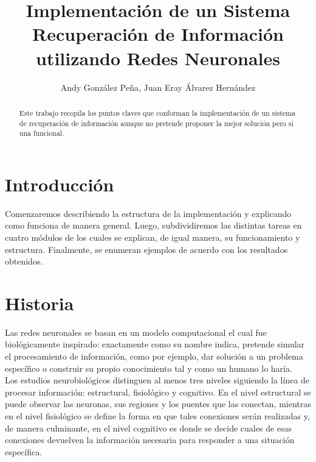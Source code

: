 \documentclass{llncs}
\begin{document}
\title{Implementaci\'on de un Sistema Recuperaci\'on de Informaci\'on utilizando Redes Neuronales}

\author{Andy Gonz\'alez Pe\~na, Juan Eray \'Alvarez Hern\'andez}

\maketitle

\begin{multicols}{2}[]

\begin{abstract}

Este trabajo recopila los puntos claves que conforman la implementaci\'on de un sistema de recuperaci\'on
de informaci\'on aunque no pretende proponer la mejor soluci\'on pero si una funcional.

\end{abstract}

\section{Introducci\'on}\label{sec:Introduction}

Comenzaremos describiendo la estructura de la implementaci\'on y explicando como funciona de manera general.
Luego, subdividiremos las distintas tareas en cuatro m\'odulos de los cuales se explican, de igual manera, su funcionamiento
y estructura. Finalmente, se enumeran ejemplos de acuerdo con los resultados obtenidos.\\

\section{Historia}\label{sec:History}

Las redes neuronales se basan en un modelo computacional el cual fue biol\'ogicamente inspirado: exactamente como
su nombre indica, pretende simular el procesamiento de informaci\'on, como por ejemplo, dar soluci\'on a un problema
espec\'ifico o construir su propio conocimiento tal y como un humano lo har\'ia. \\

Los estudios neurobiol\'ogicos distinguen al menos tres niveles siguiendo la l\'inea de procesar informaci\'on: estructural,
fisiol\'ogico y cognitivo. En el nivel estructural se puede observar las neuronas, sus regiones y los puentes que las conectan,
mientras en el nivel fisiol\'ogico se define la forma en que tales conexiones ser\'an realizadas y, de manera culminante, en
el nivel cognitivo es donde se decide cuales de esas conexiones devuelven la informaci\'on necesaria para responder a una
situaci\'on espec\'ifica. \\


\end{multicols}
\end{document}
